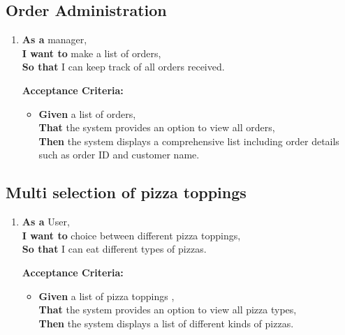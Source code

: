 
\subsection{Order Administration}

\begin{enumerate}[resume, label= \textbf{User Story \arabic*:}]
    \item \textbf{As a} manager,\\
    \textbf{I want to} make a list of orders,\\
    \textbf{So that} I can keep track of all orders received.
    
    \textbf{Acceptance Criteria:}
    \begin{itemize}
        \item \textbf{Given} a list of orders,\\
        \textbf{That} the system provides an option to view all orders,\\
        \textbf{Then} the system displays a comprehensive list including order details such as order ID and customer name.
    \end{itemize}
\end{enumerate}

\newpage
\subsection{Multi selection of pizza toppings}
\begin{enumerate}[resume, label= \textbf{User Story \arabic*:}]
    \item \textbf{As a} User,\\
    \textbf{I want to} choice between different pizza toppings,\\
    \textbf{So that} I can eat different types of pizzas.
    
    \textbf{Acceptance Criteria:}
    \begin{itemize}
        \item \textbf{Given} a list of pizza toppings ,\\
        \textbf{That} the system provides an option to view all pizza types,\\
        \textbf{Then} the system displays a list of different kinds of pizzas.
    \end{itemize}
\end{enumerate}

